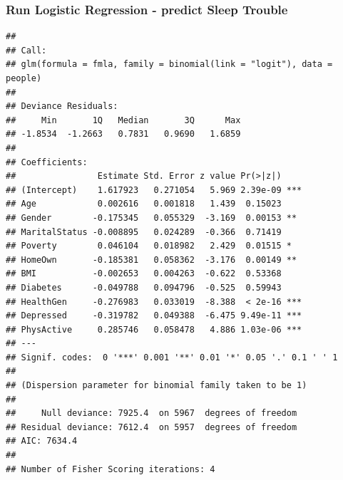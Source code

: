 \documentclass[]{article}
\newenvironment{Shaded}{\begin{snugshade}}{\end{snugshade}}
\newcommand{\KeywordTok}[1]{\textcolor[rgb]{0.13,0.29,0.53}{\textbf{{#1}}}}
\newcommand{\DataTypeTok}[1]{\textcolor[rgb]{0.13,0.29,0.53}{{#1}}}
\newcommand{\StringTok}[1]{\textcolor[rgb]{0.31,0.60,0.02}{{#1}}}
\newcommand{\CommentTok}[1]{\textcolor[rgb]{0.56,0.35,0.01}{\textit{{#1}}}}
\newcommand{\NormalTok}[1]{{#1}}
\begin{document}
\subsubsection{Run Logistic Regression - predict Sleep
Trouble}\label{run-logistic-regression---predict-sleep-trouble-1}

\begin{Shaded}
\end{Shaded}

\begin{verbatim}
## 
## Call:
## glm(formula = fmla, family = binomial(link = "logit"), data = people)
## 
## Deviance Residuals: 
##     Min       1Q   Median       3Q      Max  
## -1.8534  -1.2663   0.7831   0.9690   1.6859  
## 
## Coefficients:
##                Estimate Std. Error z value Pr(>|z|)    
## (Intercept)    1.617923   0.271054   5.969 2.39e-09 ***
## Age            0.002616   0.001818   1.439  0.15023    
## Gender        -0.175345   0.055329  -3.169  0.00153 ** 
## MaritalStatus -0.008895   0.024289  -0.366  0.71419    
## Poverty        0.046104   0.018982   2.429  0.01515 *  
## HomeOwn       -0.185381   0.058362  -3.176  0.00149 ** 
## BMI           -0.002653   0.004263  -0.622  0.53368    
## Diabetes      -0.049788   0.094796  -0.525  0.59943    
## HealthGen     -0.276983   0.033019  -8.388  < 2e-16 ***
## Depressed     -0.319782   0.049388  -6.475 9.49e-11 ***
## PhysActive     0.285746   0.058478   4.886 1.03e-06 ***
## ---
## Signif. codes:  0 '***' 0.001 '**' 0.01 '*' 0.05 '.' 0.1 ' ' 1
## 
## (Dispersion parameter for binomial family taken to be 1)
## 
##     Null deviance: 7925.4  on 5967  degrees of freedom
## Residual deviance: 7612.4  on 5957  degrees of freedom
## AIC: 7634.4
## 
## Number of Fisher Scoring iterations: 4
\end{verbatim}
\end{document}
